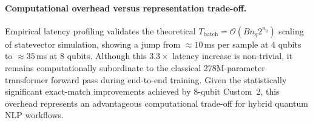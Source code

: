 \documentclass[runningheads]{llncs}
\begin{document}
\paragraph{Computational overhead versus representation trade-off.}
Empirical latency profiling validates the theoretical $T_{\text{batch}} = \mathcal{O}(B n_q 2^{n_q})$ scaling of statevector simulation, showing a jump from $\approx 10$\,ms per sample at 4 qubits to $\approx 35$\,ms at 8 qubits. Although this $3.3\times$ latency increase is non-trivial, it remains computationally subordinate to the classical 278M-parameter transformer forward pass during end-to-end training. Given the statistically significant exact-match improvements achieved by 8-qubit Custom~2, this overhead represents an advantageous computational trade-off for hybrid quantum NLP workflows.





\end{document}
